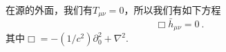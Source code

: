 在源的外面，我们有$T_{\mu\nu} = 0$，所以我们有如下方程
\begin{equation}
\Box \bar h_{\mu\nu} = 0 ~.
\end{equation}
其中$\Box = - (1/c^2) \partial_0^2 +\nabla^2$. 
